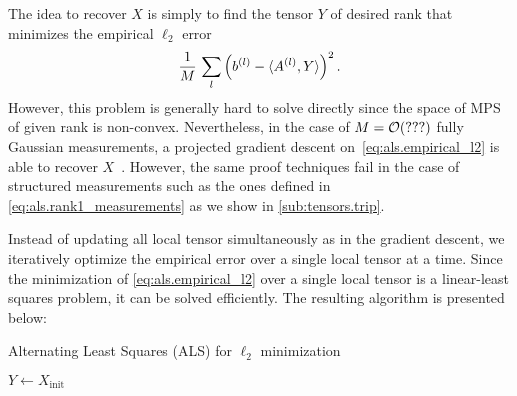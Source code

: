 The idea to recover $X$ is simply to find the tensor $Y$ of desired rank that minimizes the empirical $\ell_2$ error
\[
  \frac{1}{M} \, \sum_l \left( b^{(l)} - \braket{A^{(l)}, Y} \right)^2.
  \label{eq:als.empirical_l2}
\]
However, this problem is generally hard to solve directly since the space of MPS of given rank is non-convex.
Nevertheless, in the case of $M={\mathcal{O}}(???)$ fully Gaussian measurements, a projected gradient descent on~\eqref{eq:als.empirical_l2} is able to recover $X$~\cite{Rauhut_2014_Tensor}.
However, the same proof techniques fail in the case of structured measurements such as the ones defined in \cref{eq:als.rank1_measurements} as we show in \cref{sub:tensors.trip}.

Instead of updating all local tensor simultaneously as in the gradient descent, we iteratively optimize the empirical error over a single local tensor at a time.
Since the minimization of \cref{eq:als.empirical_l2} over a single local tensor is a linear-least squares problem, it can be solved efficiently.
The resulting algorithm is presented below:

\begin{algorithm}[H]
  \caption{\label{alg:als}Alternating Least Squares (ALS) for $\ell_2$ minimization}

  \BlankLine

  $Y \gets X_\mathrm{init}$


\end{algorithm}

